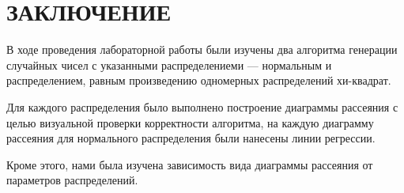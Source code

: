 \section*{ЗАКЛЮЧЕНИЕ}

В ходе проведения лабораторной работы были изучены два алгоритма
генерации случайных чисел с указанными распределениеми --- нормальным
и распределением, равным произведению одномерных распределений хи-квадрат.

Для каждого распределения было выполнено построение диаграммы рассеяния 
с целью визуальной проверки корректности алгоритма, на каждую диаграмму
рассеяния для нормального распределения были нанесены линии регрессии.

Кроме этого, нами была изучена зависимость вида диаграммы
рассеяния от параметров распределений.

\newpage
